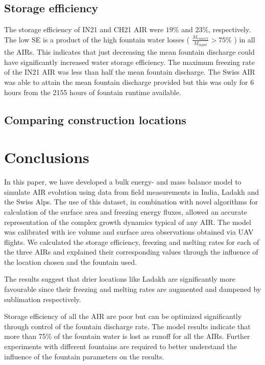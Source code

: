 \documentclass[utf8]{frontiersSCNS} %
\begin{document}
\subsection{Storage efficiency}

The storage efficiency of IN21 and CH21 AIR were $19\%$ and $23\%$, respectively. The low SE is a product of the
high  fountain water losses ( $\frac{M_{runoff}}{M_{input}}> 75 \%$ ) in all the AIRs. This indicates that just
decreasing the mean fountain discharge could have significantly increased water storage efficiency.  The maximum
freezing rate of the IN21 AIR was less than half the mean fountain discharge. The Swiss AIR was able to attain the
mean fountain discharge provided but this was only for 6 hours from the 2155 hours of fountain runtime available.

\subsection{Comparing construction locations}

\section{Conclusions}

In this paper, we have developed a bulk energy- and mass balance model to simulate AIR evolution using data from
field measurements in India, Ladakh and the Swiss Alps. The use of this dataset, in combination with novel
algorithms for calculation of the surface area and freezing energy fluxes, allowed an accurate representation of
the complex growth dynamics typical of any AIR. The model was calibrated with ice volume and surface area
observations obtained via UAV flights. We calculated the storage efficiency, freezing and melting rates for each of
the three AIRs and explained their corresponding values through the influence of the location chosen and the
fountain used.

The results suggest that drier locations like Ladakh are significantly more favourable since
their freezing and melting rates are augmented and dampened by sublimation respectively.

Storage efficiency of all the AIR are poor but can be optimized significantly through control of the fountain
discharge rate.  The model results indicate that more than 75\% of the fountain water is lost as runoff for all the
AIRs.  Further experiments with different fountains are required to better understand the influence of the fountain
parameters on the results.
\end{document}

